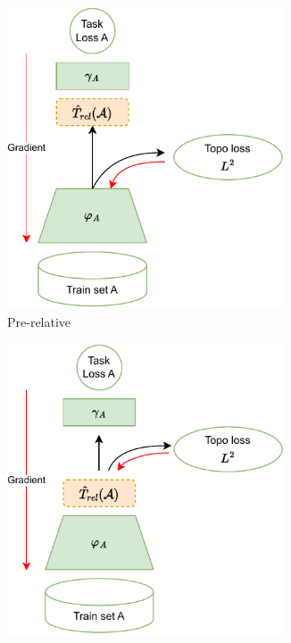 \documentclass[../main.tex]{subfiles}
\begin{document}
\begin{figure}[ht!]
     \centering
    \begin{subfigure}[b]{0.45\textwidth}
         \centering
         \includegraphics[width=0.9\textwidth]{figures/mt/relativeTopoPreScheme.pdf}
        \caption{Pre-relative}
         \label{fig:relativeTopoPreScheme}
         \vspace*{3mm}
     \end{subfigure}
     \hfill
      \begin{subfigure}[b]{0.45\textwidth}
         \centering
         \includegraphics[width=0.9\textwidth]{figures/mt/relativeTopoPostScheme.pdf}

\end{subfigure}
\end{figure}
\end{document}
